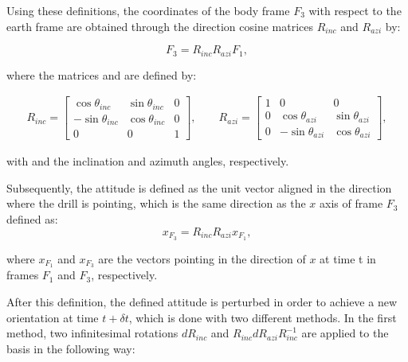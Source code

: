 Using these definitions, the coordinates of the body frame $F_3$ with respect to the earth frame are obtained through the direction cosine matrices $R_{inc}$ and $R_{azi}$ by:

\begin{equation}
F_3 = R_{inc}R_{azi}F_1,
\end{equation}

where the matrices  and  are defined by:

\begin{align*}
	R_{inc} = 
	\begin{bmatrix}
		\cos{\theta_{inc}} & \sin{\theta_{inc}} & 0 \\
		-\sin{\theta_{inc}} & \cos{\theta_{inc}} & 0 \\
		0 & 0 & 1
	\end{bmatrix}, \qquad
	R_{azi} = 
	\begin{bmatrix}
	1 & 0 & 0 \\
	0 & \cos{\theta_{azi}} & \sin{\theta_{azi}} \\
	0 & -\sin{\theta_{azi}} & \cos{\theta_{azi}}
	\end{bmatrix}, 	
\end{align*}

with  and  the inclination and azimuth angles, respectively.

Subsequently, the attitude is defined as the unit vector aligned in the direction where the drill is pointing, which is the same direction as the $x$ axis of frame $F_3$ defined as:
\begin{equation}
	x_{F_3}=R_{inc}R_{azi}x_{F_1},
\end{equation}

where $x_{F_1}$ and $x_{F_3}$ are the vectors pointing in the direction of $x$ at time t in frames $F_1$ and $F_3$, respectively. 

After this definition, the defined attitude is perturbed in order to achieve a new orientation at time $t + \delta t$, which is done with two different methods. In the first method, two infinitesimal rotations $dR_{inc}$ and $R_{inc}dR_{azi}R_{inc}^{-1}$ are applied to the basis in the following way:

